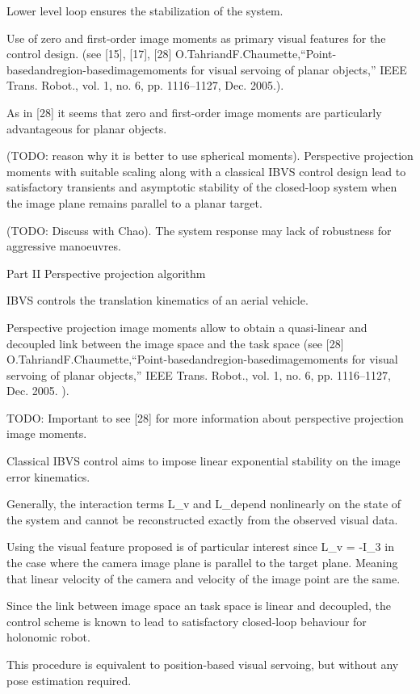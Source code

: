 Lower level loop ensures the stabilization of the system.

Use of zero and first-order image moments as primary visual features for the control design. (see [15], [17], [28] O.TahriandF.Chaumette,“Point-basedandregion-basedimagemoments for visual servoing of planar objects,” IEEE Trans. Robot., vol. 1, no. 6, pp. 1116–1127, Dec. 2005.).

As in [28] it seems that zero and first-order image moments are particularly advantageous for planar objects.

(TODO: reason why it is better to use spherical moments). Perspective projection moments with suitable scaling along with a classical IBVS control design lead to satisfactory transients and asymptotic stability of the closed-loop system when the image plane remains parallel to a planar target.

(TODO: Discuss with Chao). The system response may lack of robustness for aggressive manoeuvres. 

Part II Perspective projection algorithm

IBVS controls the translation kinematics of an aerial vehicle.

Perspective projection image moments allow to obtain a quasi-linear and decoupled link between the image space and the task space (see [28] O.TahriandF.Chaumette,“Point-basedandregion-basedimagemoments for visual servoing of planar objects,” IEEE Trans. Robot., vol. 1, no. 6, pp. 1116–1127, Dec. 2005.
).

TODO: Important to see [28] for more information about perspective projection image moments.

Classical IBVS control aims to impose linear exponential stability on the image error kinematics.

Generally, the interaction terms L_v and L_\omega depend nonlinearly on the state of the system and cannot be reconstructed exactly from the observed visual data.

Using the visual feature proposed is of particular interest since L_v = -I_3 in the case where the camera image plane is parallel to the target plane. Meaning that linear velocity of the camera and velocity of the image point are the same.

Since the link between image space an task space is linear and decoupled, the control scheme is known to lead to satisfactory closed-loop behaviour for holonomic robot.

This procedure is equivalent to position-based visual servoing, but without any pose estimation required.

